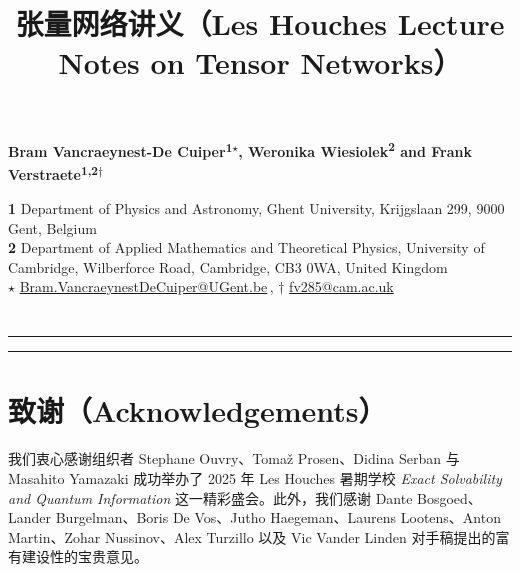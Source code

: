 \documentclass{SciPost}
\title{张量网络讲义（Les Houches Lecture Notes on Tensor Networks）}
\begin{document}
\pagestyle{SPstyle}

\begin{center}{\Large \textbf{\color{scipostdeepblue}{
张量网络讲义（Les Houches Lecture Notes on Tensor Networks）
}}}\end{center}

\begin{center}\textbf{
Bram Vancraeynest-De Cuiper\textsuperscript{1$\star$},
Weronika Wiesiolek\textsuperscript{2} and
Frank Verstraete\textsuperscript{1,2$\dagger$}
}\end{center}

\begin{center}
{\bf 1} Department of Physics and Astronomy, Ghent University, Krijgslaan 299, 9000 Gent, Belgium
\\
{\bf 2} Department of Applied Mathematics and Theoretical Physics, University of Cambridge,
Wilberforce Road, Cambridge, CB3 0WA, United Kingdom
\\[\baselineskip]
$\star$ \href{mailto:Bram.VancraeynestDeCuiper@UGent.be}{\small Bram.VancraeynestDeCuiper@UGent.be}\,,\quad
$\dagger$ \href{mailto:fv285@cam.ac.uk}{\small fv285@cam.ac.uk}
\end{center}

\section*{\color{scipostdeepblue}{摘要}}
\textbf{}

\vspace{\baselineskip}

\vspace{10pt}
\noindent\rule{\textwidth}{1pt}
\tableofcontents
\noindent\rule{\textwidth}{1pt}
\vspace{10pt}



\newpage
\newpage
\newpage
\newpage

\section*{致谢（Acknowledgements）}
我们衷心感谢组织者 Stephane Ouvry、Tomaž Prosen、Didina Serban 与 Masahito Yamazaki 成功举办了 2025 年 Les Houches 暑期学校 \emph{Exact Solvability and Quantum Information} 这一精彩盛会。此外，我们感谢 Dante Bosgoed、Lander Burgelman、Boris De Vos、Jutho Haegeman、Laurens Lootens、Anton Martin、Zohar Nussinov、Alex Turzillo 以及 Vic Vander Linden 对手稿提出的富有建设性的宝贵意见。
\end{document}
